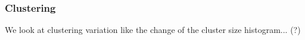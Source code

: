 \documentclass[12pt]{article}
\begin{document}
\subsubsection*{Clustering}

We look at clustering variation like the change of the cluster size histogram... (?)



\newpage



\end{document}

